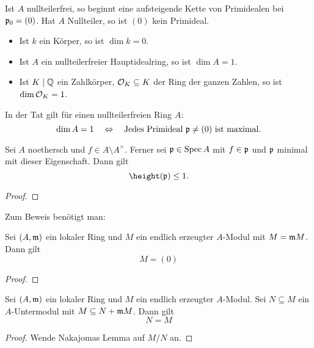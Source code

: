 \begin{bemerkung}
    Ist $A$ nullteilerfrei, so beginnt eine aufsteigende Kette von Primidealen
    bei $\mathfrak{p}_0 = (0)$. Hat $A$ Nullteiler, so ist $(0)$ kein Primideal. 
\end{bemerkung}

\begin{beispiel}
    \begin{itemize}
      \item Ist $k$ ein Körper, so ist $\dim k = 0$.
      \item Ist $A$ ein nullteilerfreier Hauptidealring, so ist 
        $\dim A = 1$.
      \item Ist $K \mid \mathbb{Q}$ ein Zahlkörper, $\mathcal{O}_K \subseteq K$ der Ring
        der ganzen Zahlen, so ist
        $\dim \mathcal{O}_K = 1$.
    \end{itemize}
\end{beispiel}

\begin{bemerkung}
    In der Tat gilt für einen nullteilerfreien Ring $A$:
    \[ \dim A = 1 \quad\Leftrightarrow\quad
        \text{Jedes Primideal } \mathfrak{p}\neq (0) \text{ ist maximal}.\]
\end{bemerkung}

\begin{satz}
    Sei $A$ noethersch und $f\in A \setminus A^\times$. Ferner sei
    $\mathfrak{p}\in\operatorname{Spec} A$ mit $f\in \mathfrak{p}$ und $\mathfrak{p}$ minimal mit dieser Eigenschaft.
    Dann gilt
    \[\height(\p) \leq 1.\]
\end{satz}
\begin{proof}
\TODO
\end{proof}

Zum Beweis benötigt man:

\begin{lemma}
    Sei $(A,\mathfrak{m})$ ein lokaler Ring und $M$ ein endlich erzeugter $A$-Modul
    mit $M = \mathfrak{m} M$. Dann gilt
    \[M = (0)\] 
\end{lemma}
\begin{proof}
\TODO
\end{proof}

\begin{korollar}
    Sei $(A,\mathfrak{m})$ ein lokaler Ring und $M$ ein endlich erzeugter $A$-Modul.
    Sei $N\subseteq M$ ein $A$-Untermodul mit $M \subseteq N + \mathfrak{m} M$.
    Dann gilt
    \[N = M\]
\end{korollar}
\begin{proof}
    Wende Nakajomas Lemma auf $M/N$ an.
\end{proof}

